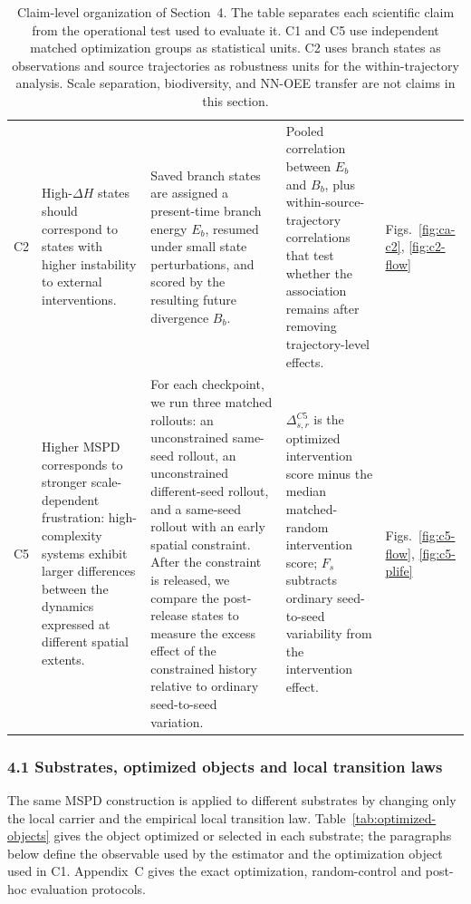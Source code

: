 \begin{table}[t]
\begin{tabular}{@{}p{}p{}p{}p{}p{}@{}}
C2
& High-$\Delta H$ states should correspond to states with higher instability to external interventions. 
& Saved branch states are assigned a present-time branch energy $E_b$, resumed under small state perturbations, and scored by the resulting future divergence $B_b$.
& Pooled correlation between $E_b$ and $B_b$, plus within-source-trajectory correlations that test whether the association remains after removing trajectory-level effects.
& Figs.~\ref{fig:ca-c2}, \ref{fig:c2-flow} \\
\addlinespace[0.60em]

C5
& Higher MSPD corresponds to stronger scale-dependent frustration: high-complexity systems exhibit larger differences between the dynamics expressed at different spatial extents.
& For each checkpoint, we run three matched rollouts: an unconstrained same-seed rollout, an unconstrained different-seed rollout, and a same-seed rollout with an early spatial constraint. After the constraint is released, we compare the post-release states to measure the excess effect of the constrained history relative to ordinary seed-to-seed variation.
& $\Delta^{C5}_{s,r}$ is the optimized intervention score minus the median matched-random intervention score; $F_s$ subtracts ordinary seed-to-seed variability from the intervention effect.
& Figs.~\ref{fig:c5-flow}, \ref{fig:c5-plife} \\
\bottomrule
\end{tabular}
\caption{Claim-level organization of Section~4. The table separates each scientific claim from the operational test used to evaluate it. C1 and C5 use independent matched optimization groups as statistical units. C2 uses branch states as observations and source trajectories as robustness units for the within-trajectory analysis. Scale separation, biodiversity, and NN-OEE transfer are not claims in this section.}
\label{tab:claim-map}
\end{table}


\FloatBarrier

\subsubsection*{4.1 Substrates, optimized objects and local transition laws}
\label{experiments:substrates}

The same MSPD construction is applied to different substrates by changing only the local carrier and the empirical local transition law.  Table~\ref{tab:optimized-objects} gives the object optimized or selected in each substrate; the paragraphs below define the observable used by the estimator and the optimization object used in C1.  Appendix~C gives the exact optimization, random-control and post-hoc evaluation protocols.

